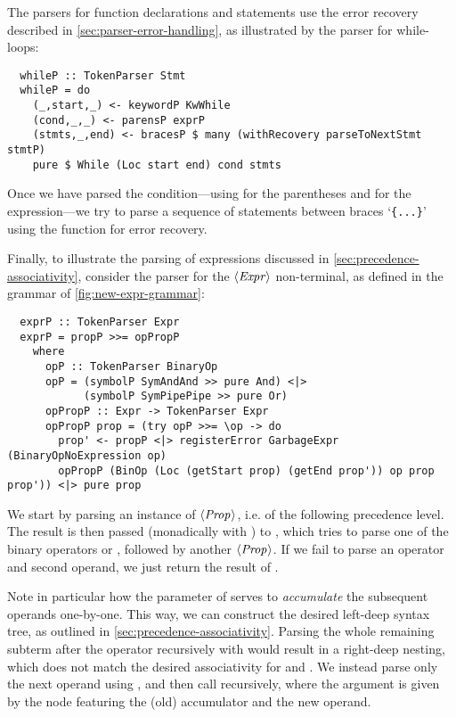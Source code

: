 The parsers for function declarations and statements use the error recovery
described in \cref{sec:parser-error-handling}, as illustrated by the parser for
while-loops:
\begin{verbatim}
  whileP :: TokenParser Stmt
  whileP = do
    (_,start,_) <- keywordP KwWhile
    (cond,_,_) <- parensP exprP
    (stmts,_,end) <- bracesP $ many (withRecovery parseToNextStmt stmtP)
    pure $ While (Loc start end) cond stmts
\end{verbatim}
%
Once we have parsed the condition---using  for the parentheses and
 for the expression---we try to parse a sequence of statements
between braces `\verb|{...}|' using the  function for
error recovery.

Finally, to illustrate the parsing of expressions discussed in
\cref{sec:precedence-associativity}, consider the parser for the $\langle \textit{Expr}\kern.7pt \rangle$
non-terminal, as defined in the grammar of \cref{fig:new-expr-grammar}:
%
\begin{verbatim}
  exprP :: TokenParser Expr
  exprP = propP >>= opPropP
    where
      opP :: TokenParser BinaryOp
      opP = (symbolP SymAndAnd >> pure And) <|>
            (symbolP SymPipePipe >> pure Or)
      opPropP :: Expr -> TokenParser Expr
      opPropP prop = (try opP >>= \op -> do
        prop' <- propP <|> registerError GarbageExpr (BinaryOpNoExpression op)
        opPropP (BinOp (Loc (getStart prop) (getEnd prop')) op prop prop')) <|> pure prop
\end{verbatim}
%
We start by parsing an instance of $\langle \textit{Prop}\kern.7pt \rangle$, i.e. of the following precedence
level. The result is then passed (monadically with \haskell{>>=}) to
, which tries to parse one of the binary operators \spl{&&} or
\code{||}, followed by another $\langle \textit{Prop}\kern.7pt \rangle$.
If we fail to parse an operator and second operand, we just return the
result of .

Note in particular how the parameter of  serves to
\emph{accumulate} the subsequent operands one-by-one. This way, we can
construct the desired left-deep syntax tree, as outlined in
\cref{sec:precedence-associativity}.
Parsing the whole remaining subterm after the operator recursively with
 would result in a right-deep nesting, which does not match the
desired associativity for \spl{&&} and \code{||}.
We instead parse only the next operand using , and then call
 recursively, where the argument is given by the 
node featuring the (old) accumulator and the new operand.


